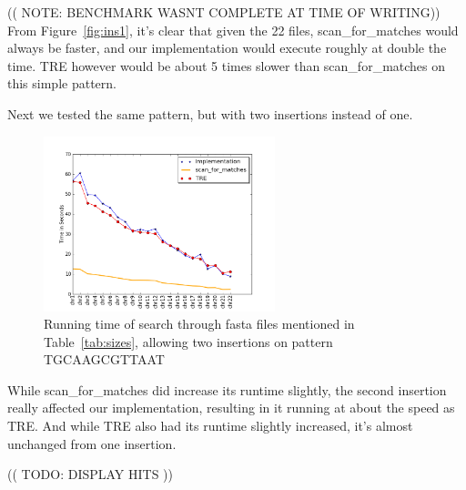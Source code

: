 (( NOTE: BENCHMARK WASNT COMPLETE AT TIME OF WRITING))
From Figure~\ref{fig:ins1}, it's clear that given the 22 files, scan\_for\_matches would always be faster, and our implementation would execute roughly at double the time. TRE however would be about 5 times slower than scan\_for\_matches on this simple pattern.
\newpage

Next we tested the same pattern, but with two insertions instead of one.
\begin{figure}[h!]
\centering
\includegraphics[width=0.6\textwidth]{Benchmarking/2ins.png}
\caption{Running time of search through fasta files mentioned in Table~\ref{tab:sizes},  allowing two insertions on pattern TGCAAGCGTTAAT}
\label{fig:ins2}
\end{figure}

While scan\_for\_matches did increase its runtime slightly, the second insertion really affected our implementation, resulting in it running at about the speed as TRE.  And while TRE also had its runtime slightly increased, it's almost unchanged from one insertion.

(( TODO: DISPLAY HITS ))